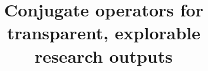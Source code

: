 \documentclass[acmsmall,screen]{acmart}
\begin{document}
\title[Conjugate operators for transparent, explorable research outputs]{Conjugate operators for transparent, explorable\\research outputs}


\ifmain
  
  \maketitle
  
  
  
  
  
  
  
  
\fi

\ifappendices
   \clearpage
   \appendix
   
\fi
\end{document}
